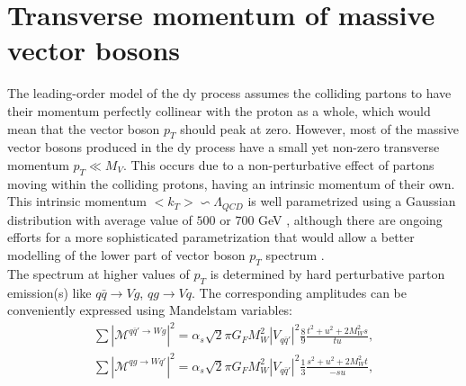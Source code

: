 		 \section{Transverse momentum of massive vector bosons }
		 The leading-order model of the \gls{dy} process assumes the colliding partons to have their momentum perfectly collinear with the proton as a whole, which would mean that the vector boson $p_T$ should peak at zero. However, most of the massive vector bosons produced in the \gls{dy} process have a small yet non-zero transverse momentum $p_T \ll M_V$. This occurs due to a non-perturbative effect of partons moving within the colliding protons, having an intrinsic momentum of their own. This intrinsic momentum $<k_T>\backsim \Lambda_{QCD}$ is well parametrized using a Gaussian distribution with average value of $500$ \cite{PhysRevD.100.074027} or $700$ GeV  \cite{Ellis:1991qj}, although there are ongoing efforts for a more sophisticated parametrization that would allow a better modelling of the lower part of vector boson $p_T$ spectrum \cite{HAUTMANN2020135478}. \\
		 The spectrum at higher values of $p_T$ is determined by hard perturbative parton emission(s) like $q\bar q \rightarrow Vg$, $qg \rightarrow Vq$. The corresponding amplitudes can be conveniently expressed using Mandelstam variables:
	\begin{equation}
	\begin{array}{lcl} 
	\label{eq::xsec_nlo}
		 \sum |\mathcal{M}^{q\bar q'\rightarrow Wg}|^2= \alpha_s \sqrt{2}\pi G_F M^2_W |V_{q\bar q'}|^2 \frac{8}{9}\frac{t^2+u^2+2M_W^2s}{tu},\\
		 \sum |\mathcal{M}^{qg\rightarrow Wq'}|^2= \alpha_s \sqrt{2}\pi G_F M^2_W |V_{q\bar q'}|^2 \frac{1}{3}\frac{s^2+u^2+2M_W^2t}{-su},
		 \end{array}
	 \end{equation}	
		
